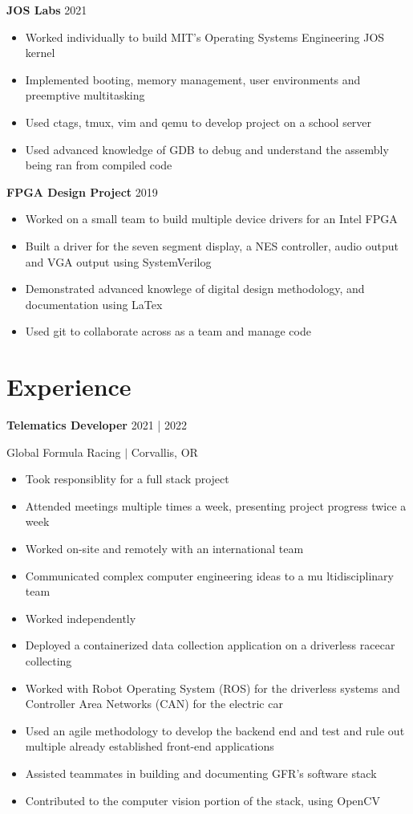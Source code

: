 \documentclass[12pt,letterpaper]{article}
\begin{document}
	\noindent \textbf{JOS Labs}
	{\hfill 2021}
	\begin{itemize}
		\item Worked individually to build MIT's Operating Systems Engineering JOS kernel
		\item Implemented booting, memory management, user environments and preemptive multitasking
		\item Used ctags, tmux, vim and qemu to develop project on a school server
		\item Used advanced knowledge of GDB to debug and understand the assembly being ran from compiled code
	\end{itemize}

	\noindent \textbf{FPGA Design Project}
	{\hfill 2019}
	\begin{itemize}
		\item Worked on a small team to build multiple device drivers for an Intel FPGA
		\item Built a driver for the seven segment display, a NES controller, audio output and VGA output using SystemVerilog
		\item Demonstrated advanced knowlege of digital design methodology, and documentation using LaTex
		\item Used git to collaborate across as a team and manage code
	\end{itemize}


	\section*{Experience}
	
	\noindent \textbf{Telematics Developer}
	{\hfill 2021 | 2022}

	\noindent Global Formula Racing $\vert$ Corvallis, OR
	\begin{itemize}
		\item Took responsiblity for a full stack project 
		\item Attended meetings multiple times a week, presenting project progress twice a week
		\item Worked on-site and remotely with an international team
		\item Communicated complex computer engineering ideas to a mu ltidisciplinary team
		\item Worked independently
		\item Deployed a containerized data collection application on a driverless racecar collecting
		\item Worked with Robot Operating System (ROS) for the driverless systems and Controller Area Networks (CAN) for the electric car
		\item Used an agile methodology to develop the backend end and test and rule out multiple already established front-end applications
		\item Assisted teammates in building and documenting GFR's software stack
		\item Contributed to the computer vision portion of the stack, using OpenCV
	\end{itemize}
\end{document}
